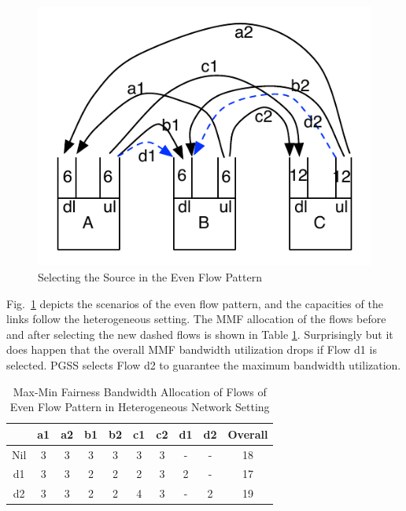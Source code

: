 \documentclass[10pt,journal,compsoc]{IEEEtran}
\begin{document}
\begin{figure}[!t]
\centering

\includegraphics[width=0.5\columnwidth,height=0.35\columnwidth]{figure4}

\caption{Selecting the Source in the Even Flow Pattern}
\label{fig:network3}
\end{figure}
 
Fig.~\ref{fig:network3} depicts the scenarios of the even flow pattern, and the capacities of the links follow the heterogeneous setting.
The MMF allocation of the flows before and after
selecting the new dashed flows is shown in Table
\ref{table:heteEven}.
Surprisingly but it does happen that the overall MMF bandwidth utilization
drops if Flow d1 is selected.
PGSS selects Flow d2 to guarantee the maximum bandwidth utilization.

\begin{table}[!t]
\renewcommand{\arraystretch}{1}
\caption{Max-Min Fairness Bandwidth Allocation of Flows of Even Flow Pattern in Heterogeneous Network Setting}
\label{table:heteEven}
\centering
\begin{tabularx}{.45\textwidth}{c||c|c|c|c|c|c|c|c|c}
\hline
\textbf{} & \textbf{a1} & \textbf{a2} & \textbf{b1} & \textbf{b2} & \textbf{c1} &\textbf{c2}& \textbf{d1}& \textbf{d2} &\textbf{Overall}\\
\hline
Nil &3&3&3&3&3&3&-&-&18\\
\hline
d1 &3&3&2&2&2&3&2&-&17\\
\hline
d2 &3&3&2&2&4&3&-&2&19\\
\hline
\end{tabularx}
\end{table}
\end{document}
